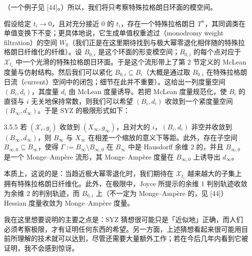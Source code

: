 （一个例子见 [44]。）所以，我们将只考察特殊拉格朗日环面的模空间。


假设给定 $t_i\to0$，且对充分接近 0 的 $t_i$，存在一个特殊拉格朗日 $T^n$，其同调类在单值变换下不变；更具体地说，它生成单值权重滤过（monodromy weight filtration）的空间 $W_0$（我们正是在这里期待找到与极大幂零退化相伴随的特殊拉格朗日纤维化的纤维）。设 $B_{0,i}$ 是这个环面的形变模空间；$B_{0,i}$ 的每个点对应于 $\mathcal{X}_{t_i}$ 中一个光滑的特殊拉格朗日环面。于是这个流形带上了第 2 节定义的 McLean 度量与仿射结构。然后我们可以紧化 $B_{0,i}\subseteq B_i$（大概是通过取 $B_{0,i}$ 在特殊拉格朗日流（current）空间中的闭包；细节在此并不重要）。这给出一列度量空间 $(B_i,d_i)$，其度量 $d_i$ 由 McLean 度量诱导。若把 McLean 度量规范化，使 $B_i$ 的直径与 $i$ 无关地保持常数，则我们可以希望 $(B_i,d_i)$ 收敛到一个紧度量空间 $(B_\infty,d_\infty)$。于是 SYZ 的极限形式如下：

\begin{conjecture}{3.5.5}
若 $(\mathcal{X}_i,g_i)$ 收敛到 $(X_\infty,g_\infty)$，且对大的 $i$，$(B_i,d_i)$ 非空并收敛到 $(B_\infty,d_\infty)$，则 $B_\infty$ 与 $X_\infty$ 在相差一个缩放的意义下等距。此外，存在子空间 $B_{\infty,0}\subseteq B_\infty$，使得 $\Gamma:=B_\infty\setminus B_{\infty,0}$ 在 $B_\infty$ 中是 Hausdorff 余维 2 的，并且 $B_{\infty,0}$ 是一个 Monge--Ampère 流形，其 Monge--Ampère 度量在 $B_{\infty,0}$ 上诱导出 $d_\infty$。
\end{conjecture}


本质上，这说的是：当趋近极大幂零退化时，我们期待在 $\mathcal{X}_{t_i}$ 越来越大的子集上拥有特殊拉格朗日纤维化。此外，在极限中，Joyce 所提示的余维 1 判别轨迹收敛为余维 2 的判别轨迹，而 $B_{0,i}$ 上（不一定为 Monge--Ampère 的，见 [44]）Hessian 度量收敛为 Monge--Ampère 度量。

我在这里想要说明的主要之点是：SYZ 猜想很可能只是「近似地」正确，而人们必须考察极限，才有证明任何东西的希望。另一方面，上述猜想看起来很可能用目前所理解的技术就可以达到，尽管还需要大量额外工作；若在今后几年内看到它被证明，我不会感到惊讶。

